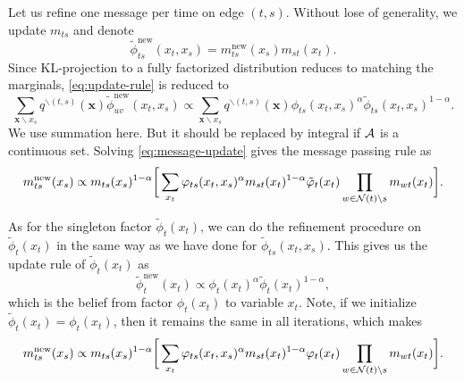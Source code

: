 \documentclass[conference,onecolumn]{IEEEtran}
\begin{document}
Let us refine one message per time on edge $(t,s)$. Without lose of generality, we update $m_{ts}$ and denote
\begin{equation}
  \tilde{\phi}_{ts}^{\mathrm{new}}(x_t, x_s) = m_{ts}^{\mathrm{new}}(x_s) m_{st}(x_t).
\end{equation}
Since KL-projection to a fully factorized distribution reduces to matching the marginals, \autoref{eq:update-rule} is reduced to
\begin{equation}\label{eq:message-update}
  \sum_{\bm{x}\backslash x_s} q^{\backslash (t,s)}(\bm{x}) \tilde{\phi}_{uv}^{\mathrm{new}}(x_t, x_s) \propto \sum_{\bm{x}\backslash x_s} q^{\backslash (t,s)}(\bm{x}) \phi_{ts}(x_t, x_s)^{\alpha} \tilde{\phi}_{ts}(x_t, x_s)^{1-\alpha}.
\end{equation}
We use summation here. But it should be replaced by integral if $\mathcal{A}$ is a continuous set.
Solving \autoref{eq:message-update} gives the message passing rule as
\begin{equation}\label{eq:message-rule}
  {m}^{\text{new}}_{ts}(x_s) \propto  m_{ts}(x_s)^{1-\alpha} \bigg[
  \sum_{x_t} \varphi_{ts}(x_t, x_s)^{\alpha} {m}_{st}(x_t)^{1-\alpha}
  \tilde{\varphi}_t(x_t) \prod_{w\in \mathcal{N}(t)\backslash s}m_{wt}(x_t) \bigg].
\end{equation}

As for the singleton factor $\tilde{\phi}_t(x_t)$, we can do the refinement procedure on $\tilde{\phi}_t(x_t)$ in the same way as we have done for $\tilde{\phi}_{ts}(x_t, x_s)$. This gives us the update rule of $\tilde{\phi}_t(x_t)$ as
\begin{equation}\label{eq:fix-factor-update}
  \tilde{\phi}_t^{\text{new}}(x_t) \propto \phi_t(x_t)^{\alpha} \tilde{\phi}_t(x_t)^{1-\alpha},
\end{equation}
which is the belief from factor $\phi_t(x_t)$ to variable $x_t$. Note, if
we initialize $\tilde{\phi}_t(x_t) = \phi_t(x_t)$, then it remains the
same in all iterations, which makes
\begin{equation}\label{eq:message-rule}
  {m}^{\text{new}}_{ts}(x_s) \propto  m_{ts}(x_s)^{1-\alpha} \bigg[
  \sum_{x_t} \varphi_{ts}(x_t, x_s)^{\alpha} {m}_{st}(x_t)^{1-\alpha} {\varphi}_t(x_t) \prod_{w\in \mathcal{N}(t)\backslash s}m_{wt}(x_t) \bigg].
\end{equation}
\end{document}
